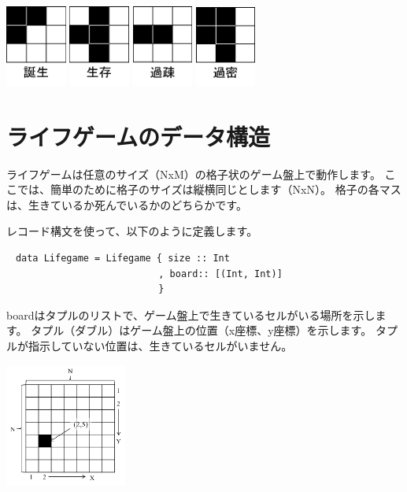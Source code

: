 \documentclass{jsarticle}
\begin{document}
\begin{center}
 \includegraphics[width=2cm]{reproduction.png}
 \includegraphics[width=2cm]{next-generation.png}
 \includegraphics[width=2cm]{under-population.png}
 \includegraphics[width=2cm]{overcrowding.png}
\end{center}

\section{ライフゲームのデータ構造}
ライフゲームは任意のサイズ（NxM）の格子状のゲーム盤上で動作します。
ここでは、簡単のために格子のサイズは縦横同じとします（NxN）。
格子の各マスは、生きているか死んでいるかのどちらかです。

レコード構文を使って、以下のように定義します。
\begin{verbatim}
　data Lifegame = Lifegame { size :: Int
                           , board:: [(Int, Int)]
                           }
\end{verbatim}

boardはタプルのリストで、ゲーム盤上で生きているセルがいる場所を示します。
タプル（ダブル）はゲーム盤上の位置（x座標、y座標）を示します。
タプルが指示していない位置は、生きているセルがいません。

\begin{center}
 \includegraphics[width=4cm]{gameboard.png}
\end{center}
\end{document}

